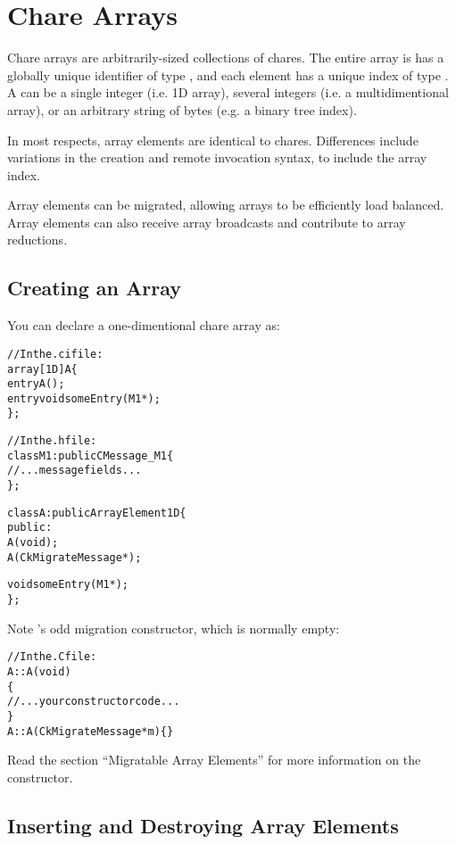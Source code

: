 \section{Chare Arrays}

Chare arrays  are arbitrarily-sized collections of chares.  The
entire array is has a globally unique identifier of type , and
each element has a unique index of type .  A 
can be a single integer (i.e. 1D array), several integers (i.e. a
multidimentional array), or an arbitrary string of bytes (e.g. a binary tree
index).

In most respects, array elements are identical to chares.  Differences
include variations in the creation and remote invocation syntax, to
include the array index.  

Array elements can be migrated, allowing arrays to be efficiently
load balanced.  Array elements can also receive array broadcasts and
contribute to array reductions.

\subsection{Creating an Array}

You can declare a one-dimentional chare array
as:

\begin{alltt}
//In the .ci file:
array [1D] A \{
  entry A();
  entry void someEntry(M1 *);
\};

//In the .h file:
class M1:public CMessage_M1 \{
//...message fields...
\};

class A : public ArrayElement1D \{
  public:
    A(void);
    A(CkMigrateMessage *);

    void someEntry(M1 *);
\};
\end{alltt}

Note 's odd migration constructor, which is normally empty:

\begin{alltt}
//In the .C file:
A::A(void)
\{
  //...your constructor code...
\}
A::A(CkMigrateMessage *m) \{ \}
\end{alltt}

Read the section ``Migratable Array Elements'' for more
information on the  constructor. 

\subsection{Inserting and Destroying Array Elements}

